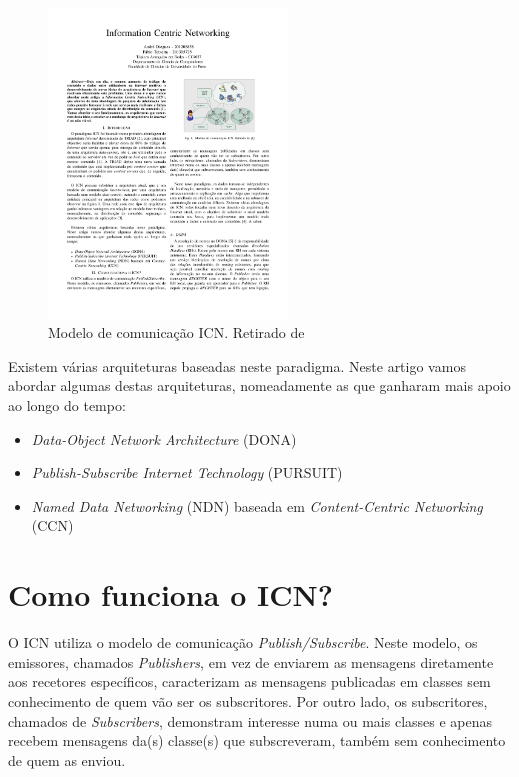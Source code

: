 \documentclass[conference]{IEEEtran}
\begin{document}
\begin{figure}[!t]
\centering
\includegraphics[width=2.5in]{icn}
\caption{Modelo de comunica\c{c}\~{a}o ICN. Retirado de \cite{ahlgren}}
\label{icn}
\end{figure}

Existem v\'{a}rias arquiteturas baseadas neste paradigma. Neste artigo vamos abordar algumas destas arquiteturas, nomeadamente as que ganharam mais apoio ao longo do tempo: \\

\begin{itemize}
\item \textit{Data-Object Network Architecture} (DONA)
\item \textit{Publish-Subscribe Internet Technology} (PURSUIT)
\item \textit{Named Data Networking} (NDN) baseada em \textit{Content-Centric Networking} (CCN) 
\end{itemize}



\section{Como funciona o ICN?}

O ICN utiliza o modelo de comunica\c{c}\~{a}o \textit{Publish/Subscribe}. Neste modelo, os emissores, chamados \textit{Publishers}, em vez de enviarem as mensagens diretamente aos recetores espec\'{i}ficos, caracterizam as mensagens publicadas em classes sem conhecimento de quem v\~{a}o ser os subscritores. Por outro lado, os subscritores, chamados de \textit{Subscribers}, demonstram interesse numa ou mais classes e apenas recebem mensagens da(s) classe(s) que subscreveram, tamb\'{e}m sem conhecimento de quem as enviou.\\ 
\end{document}
